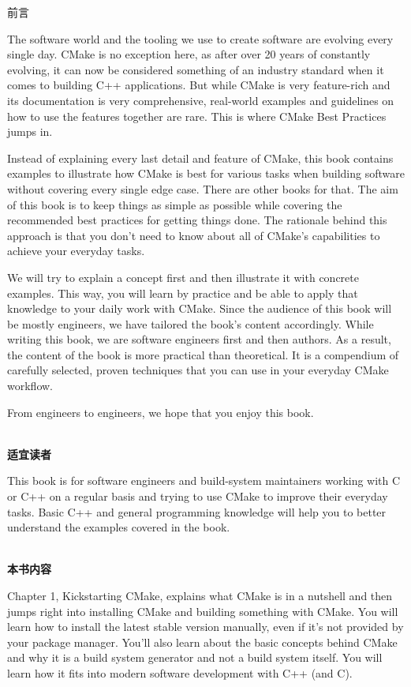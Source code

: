 \begin{flushright}
	 前言
\end{flushright}

The software world and the tooling we use to create software are evolving every single day. CMake is no exception here, as after over 20 years of constantly evolving, it can now be considered something of an industry standard when it comes to building C++ applications. But while CMake is very feature-rich and its documentation is very comprehensive, real-world examples and guidelines on how to use the features together are rare. This is where CMake Best Practices jumps in.

Instead of explaining every last detail and feature of CMake, this book contains examples to illustrate how CMake is best for various tasks when building software without covering every single edge case. There are other books for that. The aim of this book is to keep things as simple as possible while covering the recommended best practices for getting things done. The rationale behind this approach is that you don't need to know about all of CMake's capabilities to achieve your everyday tasks.

We will try to explain a concept first and then illustrate it with concrete examples. This way, you will learn by practice and be able to apply that knowledge to your daily work with CMake. Since the audience of this book will be mostly engineers, we have tailored the book's content accordingly. While writing this book, we are software engineers first and then authors. As a result, the content of the book is more practical than theoretical. It is a compendium of carefully selected, proven techniques that you can use in your everyday CMake workflow.

From engineers to engineers, we hope that you enjoy this book.

\hspace*{\fill} \\ %
\textbf{适宜读者}

This book is for software engineers and build-system maintainers working with C or C++ on a regular basis and trying to use CMake to improve their everyday tasks. Basic C++ and general programming knowledge will help you to better understand the examples covered in the book.

\hspace*{\fill} \\ %
\textbf{本书内容}

Chapter 1, Kickstarting CMake, explains what CMake is in a nutshell and then jumps right into installing CMake and building something with CMake. You will learn how to install the latest stable version manually, even if it's not provided by your package manager. You'll also learn about the basic concepts behind CMake and why it is a build system generator and not a build system itself. You will learn how it fits into modern software development with C++ (and C).

